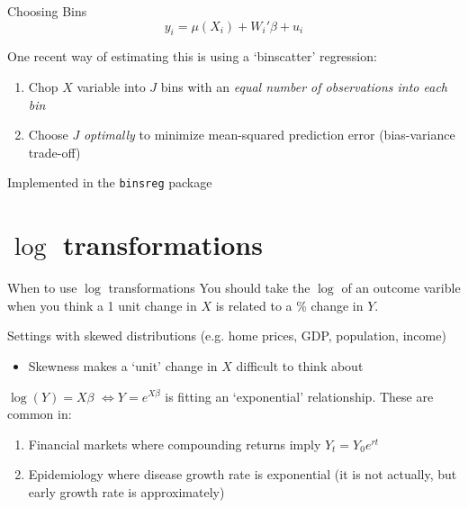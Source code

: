 \documentclass[aspectratio=169,t,11pt,table]{beamer}
\begin{document}
\begin{frame}{Choosing Bins}
  $$
    y_i = \mu(X_i) + W_i' \beta + u_i
  $$
  
  \bigskip
  One recent way of estimating this is using a `binscatter' regression:
  \begin{enumerate}
    \item Chop $X$ variable into $J$ bins with an \emph{equal number of observations into each bin}
    
    \item Choose $J$ \emph{optimally} to minimize mean-squared prediction error (bias-variance trade-off)
  \end{enumerate}

  \bigskip
  Implemented in the \texttt{binsreg} package
\end{frame}





\section{\texorpdfstring{$\log$}{log} transformations}

\begin{frame}{When to use $\log$ transformations}
  You should take the $\log$ of an outcome varible when you think a 1 unit change in $X$ is related to a \% change in $Y$. 
  
  \pause
  \bigskip
  Settings with skewed distributions (e.g. home prices, GDP, population, income)
  \begin{itemize}
    \item Skewness makes a `unit' change in $X$ difficult to think about
  \end{itemize}

  \pause
  \bigskip
  $\log(Y) = X\beta$ $\iff Y = e^{X\beta}$ is fitting an `exponential' relationship. These are common in:
  \begin{enumerate}
    \item Financial markets where compounding returns imply $Y_t = Y_0 e^{rt}$
    
    \item Epidemiology where disease growth rate is exponential (it is not actually, but early growth rate is approximately)
  \end{enumerate}
\end{frame}

\end{document}
